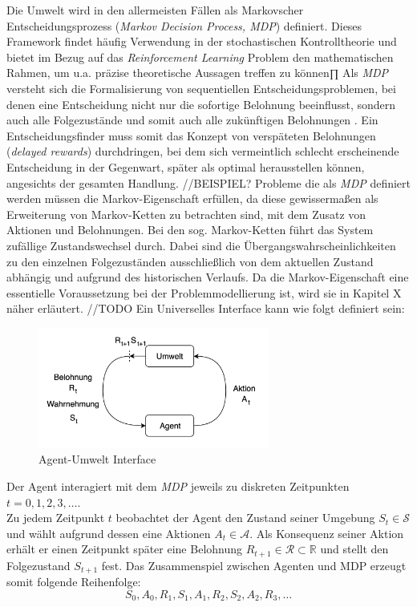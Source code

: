\par 
Die Umwelt wird in den allermeisten Fällen als Markovscher Entscheidungsprozess (\textit{Markov Decision Process, MDP}) definiert. Dieses Framework findet häufig Verwendung in der stochastischen Kontrolltheorie\cite[S.~3]{Gosavi} und bietet im Bezug auf das \textit{Reinforcement Learning} Problem den mathematischen Rahmen, um u.a. präzise theoretische Aussagen treffen zu können∏ Als \textit{MDP} versteht sich die Formalisierung von sequentiellen Entscheidungsproblemen, bei denen eine Entscheidung nicht nur die sofortige Belohnung beeinflusst, sondern auch alle Folgezustände und somit auch alle zukünftigen Belohnungen \cite[S.~47]{Sutton1998}. Ein Entscheidungsfinder muss somit das Konzept von verspäteten Belohnungen (\textit{delayed rewards}) durchdringen, bei dem sich vermeintlich schlecht erscheinende Entscheidung in der Gegenwart, später als optimal herausstellen können, angesichts der gesamten Handlung. //BEISPIEL?
Probleme die als \textit{MDP} definiert werden müssen die Markov-Eigenschaft erfüllen, da diese gewissermaßen als Erweiterung von Markov-Ketten zu betrachten sind, mit dem Zusatz von Aktionen und Belohnungen. Bei den sog. Markov-Ketten führt das System zufällige Zustandswechsel durch. Dabei sind die Übergangswahrscheinlichkeiten zu den einzelnen Folgezuständen ausschließlich von dem aktuellen Zustand abhängig und aufgrund des historischen Verlaufs\cite[S.~3]{Gosavi}. Da die Markov-Eigenschaft eine essentielle Voraussetzung bei der Problemmodellierung ist, wird sie in Kapitel X näher erläutert.
//TODO Ein Universelles Interface  kann wie folgt definiert sein:

\par 

\begin{figure}[H]
    \centering
    \includegraphics[height=150px]{images/agentUmweltInterface.png}
    \caption{Agent-Umwelt Interface}
\end{figure}


Der Agent interagiert mit dem \textit{MDP} jeweils zu diskreten Zeitpunkten $t = 0, 1, 2, 3, \dots$. \\
Zu jedem Zeitpunkt $t$ beobachtet der Agent den Zustand seiner Umgebung $S_t \in \mathcal{S}$ und wählt aufgrund dessen eine Aktionen $A_t \in \mathcal{A}$. Als Konsequenz seiner Aktion erhält er einen Zeitpunkt später eine Belohnung $R_{t+1} \in \mathcal{R} \subset\mathbb{R} $ und stellt den Folgezustand $S_{t+1}$ fest. Das Zusammenspiel zwischen Agenten und MDP erzeugt somit folgende Reihenfolge:
\begin{equation}\label{eq:episode}
    S_0, A_0, R_1, S_1, A_1, R_2, S_2, A_2, R_3, \dots
\end{equation}

